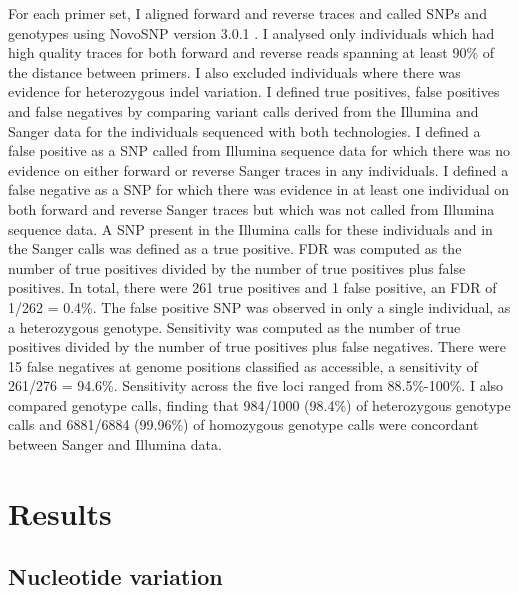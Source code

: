 \documentclass[a4paper,11pt,abstracton,hidelinks]{scrartcl}
\begin{document}
For each primer set, I aligned forward and reverse traces and called SNPs and genotypes using NovoSNP version 3.0.1 \citep{Weckx2005}.
%
I analysed only individuals which had high quality traces for both forward and reverse reads spanning at least 90\% of the distance between primers.
%
I also excluded individuals where there was evidence for heterozygous indel variation.
%
I defined true positives, false positives and false negatives by comparing variant calls derived from the Illumina and Sanger data for the individuals sequenced with both technologies.
%
I defined a false positive as a SNP called from Illumina sequence data for which there was no evidence on either forward or reverse Sanger traces in any individuals.
%
I defined a false negative as a SNP for which there was evidence in at least one individual on both forward and reverse Sanger traces but which was not called from Illumina sequence data.
%
A SNP present in the Illumina calls for these individuals and in the Sanger calls was defined as a true positive.
%
FDR was computed as the number of true positives divided by the number of true positives plus false positives.
%
In total, there were 261 true positives and 1 false positive, an FDR of 1/262 = 0.4\%.
%
The false positive SNP was observed in only a single individual, as a heterozygous genotype.
%
Sensitivity was computed as the number of true positives divided by the number of true positives plus false negatives.
%
There were 15 false negatives at genome positions classified as accessible, a sensitivity of 261/276 = 94.6\%.
%
Sensitivity across the five loci ranged from 88.5\%-100\%.
%
I also compared genotype calls, finding that 984/1000 (98.4\%) of heterozygous genotype calls and 6881/6884 (99.96\%) of homozygous genotype calls were concordant between Sanger and Illumina data.


\section{Results}


\subsection{Nucleotide variation}
\end{document}
